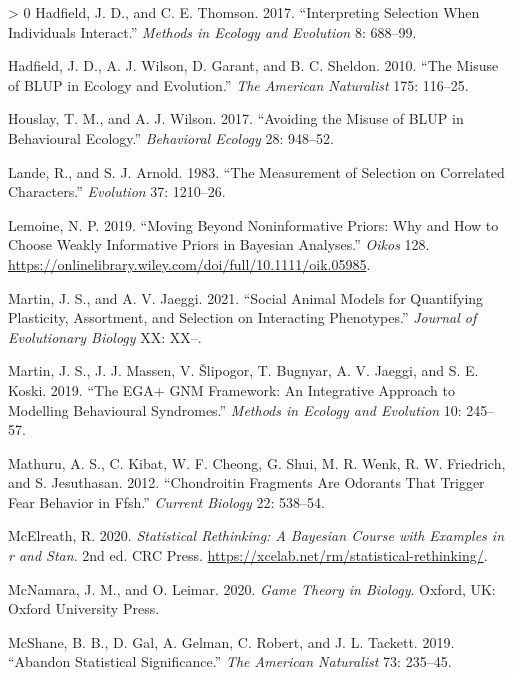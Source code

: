 \documentclass{article}
\newlength{\cslhangindent}
\newenvironment{CSLReferences}[3] %
 {%
  \setlength{\parindent}{0pt}
  \ifodd #1 \everypar{\setlength{\hangindent}{\cslhangindent}}\ignorespaces\fi
  \ifnum #2 > 0
  \setlength{\parskip}{#2\baselineskip}
  \fi
 }%
 {}
\begin{document}
\begin{CSLReferences}{1}{0}
\leavevmode\hypertarget{ref-Hadfield2017}{}%
Hadfield, J. D., and C. E. Thomson. 2017. {``Interpreting Selection When
Individuals Interact.''} \emph{Methods in Ecology and Evolution} 8:
688--99.

\leavevmode\hypertarget{ref-Hadfield2010}{}%
Hadfield, J. D., A. J. Wilson, D. Garant, and B. C. Sheldon. 2010.
{``The Misuse of BLUP in Ecology and Evolution.''} \emph{The American
Naturalist} 175: 116--25.

\leavevmode\hypertarget{ref-Hous2017}{}%
Houslay, T. M., and A. J. Wilson. 2017. {``Avoiding the Misuse of BLUP
in Behavioural Ecology.''} \emph{Behavioral Ecology} 28: 948--52.

\leavevmode\hypertarget{ref-Lande1983}{}%
Lande, R., and S. J. Arnold. 1983. {``The Measurement of Selection on
Correlated Characters.''} \emph{Evolution} 37: 1210--26.

\leavevmode\hypertarget{ref-Lemoine2019}{}%
Lemoine, N. P. 2019. {``Moving Beyond Noninformative Priors: Why and How
to Choose Weakly Informative Priors in Bayesian Analyses.''}
\emph{Oikos} 128.
\url{https://onlinelibrary.wiley.com/doi/full/10.1111/oik.05985}.

\leavevmode\hypertarget{ref-Martin2021}{}%
Martin, J. S., and A. V. Jaeggi. 2021. {``Social Animal Models for
Quantifying Plasticity, Assortment, and Selection on Interacting
Phenotypes.''} \emph{Journal of Evolutionary Biology} XX: XX--.

\leavevmode\hypertarget{ref-Martin2019}{}%
Martin, J. S., J. J. Massen, V. Šlipogor, T. Bugnyar, A. V. Jaeggi, and
S. E. Koski. 2019. {``The EGA+ GNM Framework: An Integrative Approach to
Modelling Behavioural Syndromes.''} \emph{Methods in Ecology and
Evolution} 10: 245--57.

\leavevmode\hypertarget{ref-Mathuru2012}{}%
Mathuru, A. S., C. Kibat, W. F. Cheong, G. Shui, M. R. Wenk, R. W.
Friedrich, and S. Jesuthasan. 2012. {``Chondroitin Fragments Are
Odorants That Trigger Fear Behavior in Ffsh.''} \emph{Current Biology}
22: 538--54.

\leavevmode\hypertarget{ref-Rethinking}{}%
McElreath, R. 2020. \emph{Statistical Rethinking: A Bayesian Course with
Examples in r and Stan}. 2nd ed. CRC Press.
\url{https://xcelab.net/rm/statistical-rethinking/}.

\leavevmode\hypertarget{ref-McNamara2020}{}%
McNamara, J. M., and O. Leimar. 2020. \emph{Game Theory in Biology}.
Oxford, UK: Oxford University Press.

\leavevmode\hypertarget{ref-McShane2019}{}%
McShane, B. B., D. Gal, A. Gelman, C. Robert, and J. L. Tackett. 2019.
{``Abandon Statistical Significance.''} \emph{The American Naturalist}
73: 235--45.


\end{CSLReferences}
\end{document}

